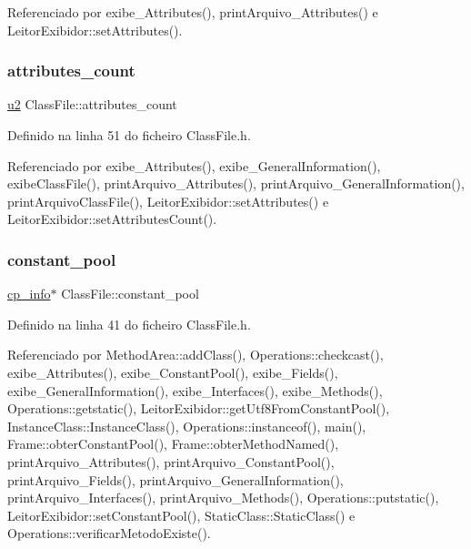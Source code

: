 Referenciado por exibe\+\_\+\+Attributes(), print\+Arquivo\+\_\+\+Attributes() e Leitor\+Exibidor\+::set\+Attributes().

\mbox{\label{classClassFile_a633c696fbe08e7e7906b2ab1e52f3d1b}} 
\subsubsection{\texorpdfstring{attributes\+\_\+count}{attributes\_count}}
{\footnotesize\ttfamily \hyperlink{BasicTypes_8h_a732cde1300aafb73b0ea6c2558a7a54f}{u2} Class\+File\+::attributes\+\_\+count}



Definido na linha 51 do ficheiro Class\+File.\+h.



Referenciado por exibe\+\_\+\+Attributes(), exibe\+\_\+\+General\+Information(), exibe\+Class\+File(), print\+Arquivo\+\_\+\+Attributes(), print\+Arquivo\+\_\+\+General\+Information(), print\+Arquivo\+Class\+File(), Leitor\+Exibidor\+::set\+Attributes() e Leitor\+Exibidor\+::set\+Attributes\+Count().

\mbox{\label{classClassFile_a2309d843091aad79aed04ce92470a434}} 
\subsubsection{\texorpdfstring{constant\+\_\+pool}{constant\_pool}}
{\footnotesize\ttfamily \hyperlink{structcp__info}{cp\+\_\+info}$\ast$ Class\+File\+::constant\+\_\+pool}



Definido na linha 41 do ficheiro Class\+File.\+h.



Referenciado por Method\+Area\+::add\+Class(), Operations\+::checkcast(), exibe\+\_\+\+Attributes(), exibe\+\_\+\+Constant\+Pool(), exibe\+\_\+\+Fields(), exibe\+\_\+\+General\+Information(), exibe\+\_\+\+Interfaces(), exibe\+\_\+\+Methods(), Operations\+::getstatic(), Leitor\+Exibidor\+::get\+Utf8\+From\+Constant\+Pool(), Instance\+Class\+::\+Instance\+Class(), Operations\+::instanceof(), main(), Frame\+::obter\+Constant\+Pool(), Frame\+::obter\+Method\+Named(), print\+Arquivo\+\_\+\+Attributes(), print\+Arquivo\+\_\+\+Constant\+Pool(), print\+Arquivo\+\_\+\+Fields(), print\+Arquivo\+\_\+\+General\+Information(), print\+Arquivo\+\_\+\+Interfaces(), print\+Arquivo\+\_\+\+Methods(), Operations\+::putstatic(), Leitor\+Exibidor\+::set\+Constant\+Pool(), Static\+Class\+::\+Static\+Class() e Operations\+::verificar\+Metodo\+Existe().

